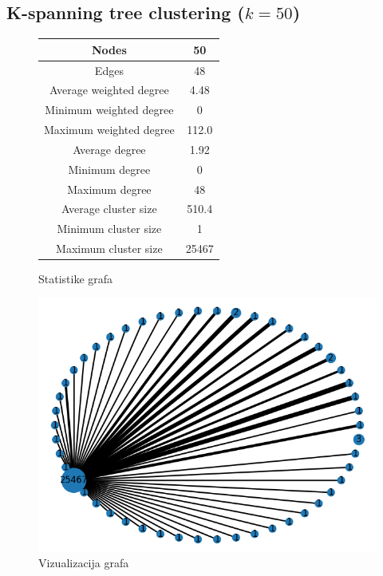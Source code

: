 \documentclass[a4paper,12pt]{article}
\begin{document}
	\subsection{K-spanning tree clustering ($k = 50$)}
	\begin{figure}[H]
		\centering
		\begin{tabular}{ |c|c| } 
			\hline
			Nodes& 50 \\
			\hline
			Edges& 48 \\
			\hline
			Average weighted degree& 4.48 \\
			Minimum weighted degree& 0  \\
			Maximum weighted degree& 112.0 \\
			\hline
			Average degree& 1.92 \\
			Minimum degree& 0 \\ 
			Maximum degree& 48 \\
			\hline
			Average cluster size& 510.4 \\
			Minimum cluster size& 1 \\
			Maximum cluster size& 25467 \\
			\hline
			
		\end{tabular}
		\caption{Statistike grafa}
	\end{figure}	
	
	\begin{figure}[H]
		\centering
		\includegraphics[scale=0.7]{spanning_merged_graph_50_visualization}
		\caption{Vizualizacija grafa}
	\end{figure}
\end{document}
